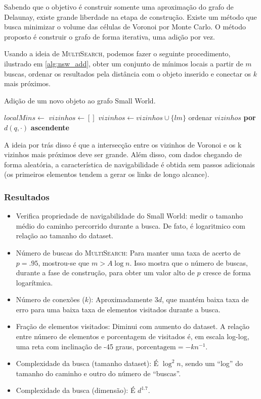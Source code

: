 Sabendo que o objetivo é construir somente uma aproximação do grafo de Delaunay, existe grande liberdade na etapa de construção. Existe um método que busca minimizar o volume das células de Voronoi por Monte Carlo. O método proposto é construir o grafo de forma iterativa, uma adição por vez.

Usando a ideia de 
\textsc{MultiSearch}, podemos fazer o seguinte procedimento, ilustrado em \cref{alg:nsw_add}, obter um conjunto de mínimos locais a partir de $m$ buscas, ordenar os resultados pela distância com o objeto inserido e conectar os $k$ mais próximos.

\begin{algorithm}
\caption{Adição de um novo objeto ao grafo Small World.}
\label{alg:nsw_add}
\begin{algorithmic}[1]
\State $localMins \gets$ 
\State $vizinhos \gets []$
    \State $vizinhos \gets vizinhos \cup \{lm\}$
\EndFor
\State ordenar $vizinhos$ \textbf{por} $d(q, \cdot)$ \textbf{ascendente}
    \State {}
\EndFor
\EndProcedure
\end{algorithmic}
\end{algorithm}

A ideia por trás disso é que a intersecção entre os vizinhos de Voronoi e os k vizinhos mais próximos deve ser grande. Além disso, com dados chegando de forma aleatória, a característica de navigabilidade é obtida sem passos adicionais (os primeiros elementos tendem a gerar os links de longo alcance).

\subsubsection{Resultados}

\begin{itemize}
    \item Verifica propriedade de navigabilidade do Small World: medir o tamanho médio do caminho percorrido durante a busca. De fato, é logaritmico com relação ao tamanho do dataset.
    \item Número de buscas do \textsc{MultiSearch}: Para manter uma taxa de acerto de $p=.95$, mostrou-se que $m>A\log n$. Isso mostra que o número de buscas, durante a fase de construção, para obter um valor alto de $p$ cresce de forma logarítmica.
    \item Número de conexões ($k$): Aproximadamente $3d$, que mantém baixa taxa de erro para uma baixa taxa de elementos visitados durante a busca.
    \item Fração de elementos visitados: Diminui com aumento do dataset. A relação entre número de elementos e porcentagem de visitados é, em escala log-log, uma reta com inclinação de -45 graus, $\text{porcentagem} = -kn^{-1}$.
    \item Complexidade da busca (tamanho dataset): É $\log^2 n$, sendo um ``log'' do tamanho do caminho e outro do número de ``buscas''.
    \item Complexidade da busca (dimensão): É $d^{1.7}$.
\end{itemize}

